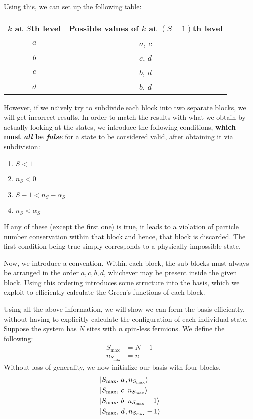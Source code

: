 	Using this, we can set up the following table:
	\begin{table}[h!]
		\centering
		\begin{tabular}{cc}
			\toprule
			$ k $ at $ S $th level & Possible values of $ k $ at $ (S-1) $th level\\
			\midrule
			$ a $ & $ a $, $ c $\\
			$ b $ & $ c $, $ d $\\
			$ c $ & $ b $, $ d $\\
			$ d $ & $ b $, $ d $\\
			\bottomrule
		\end{tabular}
	\end{table}
	\pagebreak
	
	However, if we na\"{\i}vely try to subdivide each block into two separate blocks, we will get incorrect results. In order to match the results with what we obtain by actually looking at the states, we introduce the following conditions, \textbf{which must \emph{all} be \emph{false}} for a state to be considered valid, after obtaining it via subdivision:
	\begin{enumerate}
		\item $ S < 1 $
		\item $ n_S < 0 $
		\item $ S - 1 < n_S - \alpha_S $
		\item $ n_S < \alpha_S $
	\end{enumerate}
	If any of these (except the first one) is true, it leads to a violation of particle number conservation within that  block and hence, that block is discarded. The first condition being true simply corresponds to a physically impossible state.
	
	Now, we introduce a convention. Within each block, the sub-blocks must always be arranged in the order $ a, c, b, d $, whichever may be present inside the given block. Using this ordering introduces some structure into the basis, which we exploit to efficiently calculate the Green's functions of each block.
	
	Using all the above information, we will show we can form the basis efficiently, without having to explicitly calculate the configuration of each individual state. Suppose the system has $ N $ sites with $ n $ spin-less fermions. We define the following:
	\begin{align*}
		S_{\mathrm{max}} &= N-1\\
		n_{S_{\mathrm{max}}} &= n
	\end{align*}
	Without loss of generality, we now initialize our basis with four blocks.
	\begin{align*}
		&\ket{S_{\mathrm{max}}, \,a\,, n_{S_{\mathrm{max}}}}\\
		&\ket{S_{\mathrm{max}}, \,c\,, n_{S_{\mathrm{max}}}}\\
		&\ket{S_{\mathrm{max}}, \,b\,, n_{S_{\mathrm{max}}}-1}\\
		&\ket{S_{\mathrm{max}}, \,d\,, n_{S_{\mathrm{max}}}-1}
	\end{align*}
	
